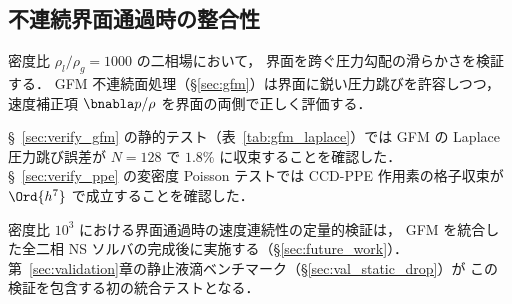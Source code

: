 %
\subsection{不連続界面通過時の整合性}
\label{sec:interface_crossing}

密度比 $\rho_l/\rho_g = 1000$ の二相場において，
界面を跨ぐ圧力勾配の滑らかさを検証する．
GFM 不連続面処理（§\ref{sec:gfm}）は界面に鋭い圧力跳びを許容しつつ，
速度補正項 $\bnabla p / \rho$ を界面の両側で正しく評価する．

§~\ref{sec:verify_gfm} の静的テスト（表~\ref{tab:gfm_laplace}）では
GFM の Laplace 圧力跳び誤差が $N=128$ で $1.8\%$ に収束することを確認した．
§~\ref{sec:verify_ppe} の変密度 Poisson テストでは
CCD-PPE 作用素の格子収束が $\Ord{h^7}$ で成立することを確認した．

密度比 $10^3$ における界面通過時の速度連続性の定量的検証は，
GFM を統合した全二相 NS ソルバの完成後に実施する（§\ref{sec:future_work}）．
第~\ref{sec:validation}章の静止液滴ベンチマーク（§\ref{sec:val_static_drop}）が
この検証を包含する初の統合テストとなる．
